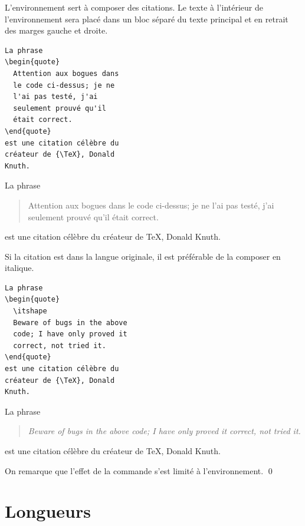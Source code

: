 \begin{exemple}
  L'environnement  sert à composer des citations. Le texte à
  l'intérieur de l'environnement sera placé dans un bloc séparé du
  texte principal et en retrait des marges gauche et droite.
  \begin{demo}
    \begin{texample}
\begin{lstlisting}
La phrase
\begin{quote}
  Attention aux bogues dans
  le code ci-dessus; je ne
  l'ai pas testé, j'ai
  seulement prouvé qu'il
  était correct.
\end{quote}
est une citation célèbre du
créateur de {\TeX}, Donald
Knuth.
\end{lstlisting}
      \producing
      La phrase
      \begin{quote}
        Attention aux bogues dans le code ci-dessus; je ne l'ai pas testé,
        j'ai seulement prouvé qu'il était correct.
      \end{quote}
      est une citation célèbre du créateur de {\TeX}, Donald Knuth.
    \end{texample}
  \end{demo}
  Si la citation est dans la langue originale, il est préférable de la
  composer en italique.
  \begin{demo}
    \begin{texample}
\begin{lstlisting}
La phrase
\begin{quote}
  \itshape
  Beware of bugs in the above
  code; I have only proved it
  correct, not tried it.
\end{quote}
est une citation célèbre du
créateur de {\TeX}, Donald
Knuth.
\end{lstlisting}
      \producing
      La phrase
      \begin{quote}
        \itshape
        Beware of bugs in the above code; I have only proved it
        correct, not tried it.
      \end{quote}
      est une citation célèbre du créateur de {\TeX}, Donald Knuth.
    \end{texample}
  \end{demo}
  On remarque que l'effet de la commande \cmdprint{\itshape} s'est
  limité à l'environnement. %
  \qed
\end{exemple}


\section{Longueurs}
\label{sec:bases:longueurs}

